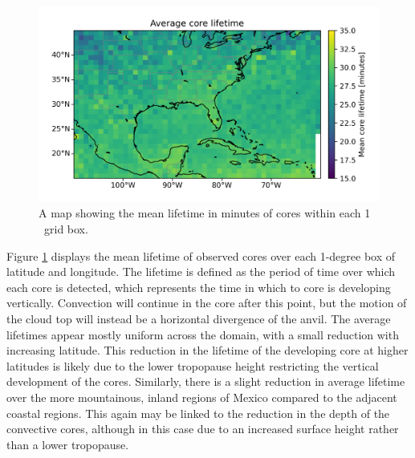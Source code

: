 \begin{figure}[tp]
    \centering
    \includegraphics[width=\textwidth]{figures/chapter2_06.png}
    \caption[
    A map showing the mean lifetime in minutes of cores within each 1
    \textdegree\ grid box
    ]{
    A map showing the mean lifetime in minutes of cores within each 1
    \textdegree\ grid box.
    }
    \label{fig:core_lifetime_map}
\end{figure}

Figure \ref{fig:core_lifetime_map} displays the mean lifetime of observed cores over each 1-degree box of latitude and longitude.
The lifetime is defined as the period of time over which each core is detected, which represents the time in which to core is developing vertically.
Convection will continue in the core after this point, but the motion of the cloud top will instead be a horizontal divergence of the anvil.
The average lifetimes appear mostly uniform across the domain, with a small reduction with increasing latitude.
This reduction in the lifetime of the developing core at higher latitudes is likely due to the lower tropopause height restricting the vertical development of the cores.
Similarly, there is a slight reduction in average lifetime over the more mountainous, inland regions of Mexico compared to the adjacent coastal regions.
This again may be linked to the reduction in the depth of the convective cores, although in this case due to an increased surface height rather than a lower tropopause.



